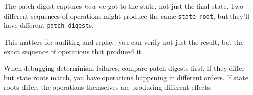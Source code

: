 \begin{commentary}
The patch digest captures \emph{how} we got to the state, not just the final state. Two different sequences of operations might produce the same \texttt{state\_root}, but they'll have different \texttt{patch\_digest}s.

This matters for auditing and replay: you can verify not just the result, but the exact sequence of operations that produced it.
\end{commentary}

\begin{protip}
When debugging determinism failures, compare patch digests first. If they differ but state roots match, you have operations happening in different orders. If state roots differ, the operations themselves are producing different effects.
\end{protip}
